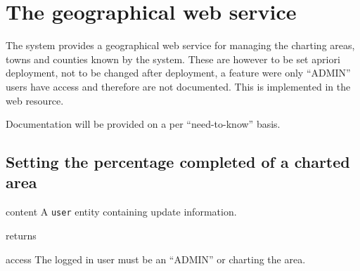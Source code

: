 \section{The geographical web service}

The system provides a geographical web service for managing the charting areas,
towns and counties known by the system. These are however to be set apriori
deployment, not to be changed after deployment, a feature were only ``ADMIN''
users have access and therefore are not documented. This is implemented in the
 web resource.

Documentation will be provided on a per ``need-to-know'' basis.

\subsection{Setting the percentage completed of a charted area}

\begin{apidata}{content}
  A \texttt{user} entity containing update information.
\end{apidata}
\begin{apidata}{returns}
  \begin{datalist}
  \end{datalist}
\end{apidata}
\begin{apidata}{access}
The logged in user must be an ``ADMIN'' or charting the area.
\end{apidata}


